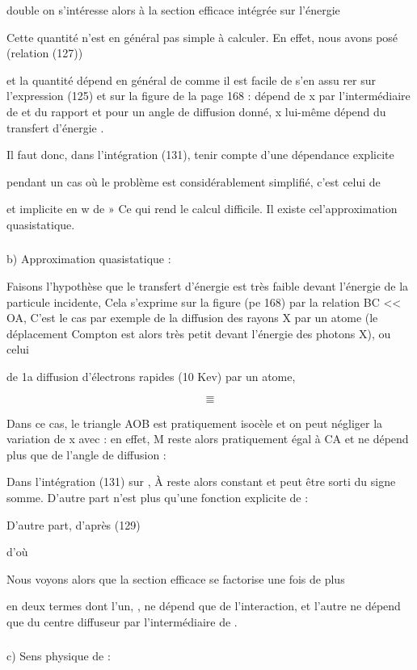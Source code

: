 double  on s'intéresse alors à la section efficace intégrée sur
l'énergie

Cette quantité n'est en général pas simple à calculer. En effet, nous avons
posé (relation (127))

et la quantité dépend en général de  comme il est facile de s'en assu
rer sur l'expression (125) et sur la figure de la page 168 :  dépend de x
par l'intermédiaire de  et du rapport  et pour un angle de diffusion
 donné, x lui-même dépend du transfert d'énergie .

Il faut donc, dans l'intégration (131), tenir compte d'une dépendance explicite

pendant un cas où le problème est considérablement simplifié, c'est celui de

et implicite en w de » Ce qui rend le calcul difficile. Il existe cel'approximation quasistatique.

\subsubsection{}%
b) Approximation quasistatique :

Faisons l'hypothèse que le transfert d'énergie est très faible
devant l'énergie de la particule incidente, Cela s'exprime sur la figure
(pe 168) par la relation BC << OA,
C'est le cas par exemple de la diffusion des rayons X par un atome (le déplacement
Compton est alors très petit devant l'énergie des photons X), ou celui

de 1a diffusion d'électrons rapides (10 Kev) par un atome,

\[
\tag{132}=
\]
\[
\tag{133}=
\]

Dans ce cas, le triangle AOB est pratiquement isocèle et on
peut négliger la variation de x avec  : en effet, M reste alors pratiquement égal
à CA et ne dépend plus que de l'angle de diffusion :

Dans l'intégration (131) sur , À reste alors constant et peut être sorti
du signe somme. D'autre part  n'est plus qu'une fonction explicite
de  :

D'autre part, d'après (129)

d'où

Nous voyons alors que la section efficace se factorise une fois de plus

en deux termes dont l'un, , ne dépend que de l'interaction, et l'autre ne
dépend que du centre diffuseur par l'intermédiaire de .

\subsubsection{}%
c) Sens physique de :


